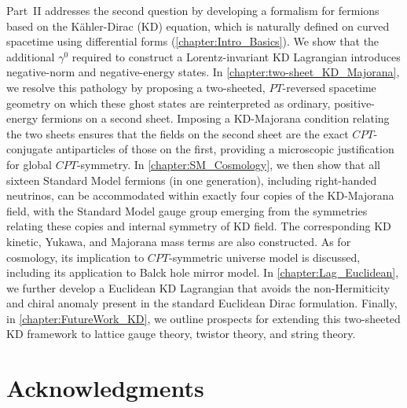\documentclass[12pt,a4paper]{report}
\begin{document}
Part~II addresses the second question by developing a formalism for fermions based on the K\"{a}hler-Dirac (KD) equation, which is naturally defined on curved spacetime using differential forms (\cref{chapter:Intro_Basics}). We show that the additional $\gamma^0$ required to construct a Lorentz-invariant KD Lagrangian introduces negative-norm and negative-energy states. In \cref{chapter:two-sheet_KD_Majorana}, we resolve this pathology by proposing a two-sheeted, $PT$-reversed spacetime geometry on which these ghost states are reinterpreted as ordinary, positive-energy fermions on a second sheet. Imposing a KD-Majorana condition relating the two sheets ensures that the fields on the second sheet are the exact $CPT$-conjugate antiparticles of those on the first, providing a microscopic justification for global $CPT$-symmetry. In \cref{chapter:SM_Cosmology}, we then show that all sixteen Standard Model fermions (in one generation), including right-handed neutrinos, can be accommodated within exactly four copies of the KD-Majorana field, with the Standard Model gauge group emerging from the symmetries relating these copies and internal symmetry of KD field. The corresponding KD kinetic, Yukawa, and Majorana mass terms are also constructed. As for cosmology, its implication to $CPT$-symmetric universe model is discussed, including its application to Balck hole mirror model. In \cref{chapter:Lag_Euclidean}, we further develop a Euclidean KD Lagrangian that avoids the non-Hermiticity and chiral anomaly present in the standard Euclidean Dirac formulation. Finally, in \cref{chapter:FutureWork_KD}, we outline prospects for extending this two-sheeted KD framework to lattice gauge theory, twistor theory, and string theory.

\chapter*{Acknowledgments}
\end{document}
